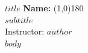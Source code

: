 \documentclass{article}
\begin{document}
\textbf{$title$} \hspace*{2in} \textbf{Name:} \line(1,0){180}\\
$subtitle$\\
Instructor: $author$\\

$body$
\end{document}
